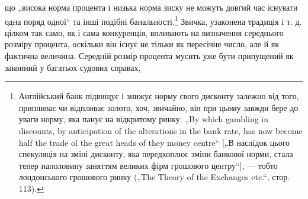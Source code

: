 що „висока норма процента і низька норма зиску не можуть
довгий час існувати одна поряд одної“ та інші подібні банальності.\footnote{
Англійський банк підвищує і знижує норму свого дисконту залежно від
того, припливає чи відпливає золото, хоч, звичайно, він при цьому завжди бере
до уваги норму, яка панує на відкритому ринку. „By which gambling in discounts,
by anticipation of the alterations in the bank rate, has now become half the trade
ol the great heads of they money centre“ [„В наслідок цього спекуляція на зміні
дисконту, яка передхоплює зміни банкової норми, стала тепер наполовину
заняттям великих фірм грошового центру“], — тобто лондонського грошового
ринку („The Theory of the Exchanges etc.“, стор. 113).
}
Звичка, узаконена традиція і т. д. цілком так само, як
і сама конкуренція, впливають на визначення середнього розміру
процента, оскільки він існує не тільки як пересічне число,
але й як фактична величина. Середній розмір процента мусить
уже бути припущений як законний у багатьох судових справах,
\parbreak{}  %
